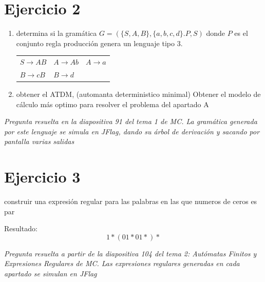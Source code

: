 \documentclass{article}
\begin{document}

        \section*{Ejercicio 2}
        \begin{enumerate}
            \item determina si la gramática $G = (\{S,A,B\}, \{a,b,c,d\}. P,S)$ donde $P$ es el conjunto regla producción
            genera un lenguaje tipo 3.
            
            \begin{tabularx}{\textwidth}{XXX}
                $S \rightarrow AB$ & $A \rightarrow Ab$ & $A \rightarrow a$\\
                $B \rightarrow cB$ & $B \rightarrow d$\\
            \end{tabularx}
            

            \item obtener el ATDM, (automanta deterministico minimal)
            Obtener el modelo de cálculo más optimo para resolver el problema del apartado A
        \end{enumerate}
        
        \vspace{\baselineskip} %

        \textit{
        Pregunta resuelta en la diapositiva 91 del tema 1 de MC.
        La gramática generada por este lenguaje se simula en JFlag,
        dando su árbol de derivación y sacando por pantalla varias
        salidas
        }

        \newpage

        \section*{Ejercicio 3}
        construir una expresión regular para las palabras en las que numeros de ceros es par
        
        \vspace{\baselineskip} %

        Resultado: $$ 1*(01*01*)*$$
        

        \vspace{\baselineskip} %
        \textit{
            Pregunta resuelta a partir de la diapositiva 104 del tema 2:
            Autómatas Finitos y Expresiones Regulares de MC.
            Las expresiones regulares generadas en cada apartado se
            simulan en JFlag
        }
\end{document}
